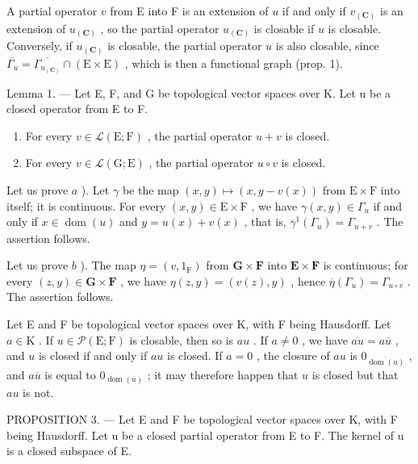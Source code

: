 A partial operator \(v\) from E into F is an extension of \(u\) if and only if \(v_{(\mathbf{C})}\) is an extension of \(u_{(\mathbf{C})}\) , so the partial operator \(u_{(\mathbf{C})}\) is closable if \(u\) is closable. Conversely, if \(u_{(\mathbf{C})}\) is closable, the partial operator \(u\) is also closable, since \(\overline{\Gamma_u} = \overline{\Gamma_{u_{(\mathbf{C})}}} \cap (\mathrm{E} \times \mathrm{E})\) , which is then a functional graph (prop. 1).

Lemma 1. — Let E, F, and G be topological vector spaces over K. Let u be a closed operator from E to F.

\begin{enumerate}
\def\labelenumi{\alph{enumi})}
\item
  For every \(v \in \mathcal{L}(\mathrm{E};\mathrm{F})\) , the partial operator \(u + v\) is closed.
\item
  For every \(v \in \mathcal{L}(\mathrm{G};\mathrm{E})\) , the partial operator \(u \circ v\) is closed.
\end{enumerate}

Let us prove \(a\) ). Let \(\gamma\) be the map \((x,y)\mapsto (x,y - v(x))\) from \(\mathrm{E}\times \mathrm{F}\) into itself; it is continuous. For every \((x,y)\in \mathrm{E}\times \mathrm{F}\) , we have \(\gamma (x,y)\in \Gamma_u\) if and only if \(x\in \operatorname {dom}(u)\) and \(y = u(x) + v(x)\) , that is, \(\overline{\gamma}^{1}(\Gamma_{u}) = \Gamma_{u + v}\) . The assertion follows.

Let us prove \(b\) ). The map \(\eta = (v, 1_{\mathrm{F}})\) from \(\mathbf{G} \times \mathbf{F}\) into \(\mathbf{E} \times \mathbf{F}\) is continuous; for every \((z, y) \in \mathbf{G} \times \mathbf{F}\) , we have \(\eta(z, y) = (v(z), y)\) , hence \(\overline{\eta}(\Gamma_u) = \Gamma_{u \circ v}\) . The assertion follows.

Let E and F be topological vector spaces over K, with F being Hausdorff. Let \(a \in \mathrm{K}\) . If \(u \in \mathcal{P}(\mathrm{E};\mathrm{F})\) is closable, then so is \(au\) . If \(a \neq 0\) , we have \(\overline{au} = a\overline{u}\) , and \(u\) is closed if and only if \(au\) is closed. If \(a = 0\) , the closure of \(au\) is \(0_{\overline{\operatorname{dom}(u)}}\) , and \(a\overline{u}\) is equal to \(0_{\operatorname{dom}(\overline{u})}\) ; it may therefore happen that \(u\) is closed but that \(au\) is not.

PROPOSITION 3. --- Let E and F be topological vector spaces over K, with F being Hausdorff. Let u be a closed partial operator from E to F. The kernel of u is a closed subspace of E.

